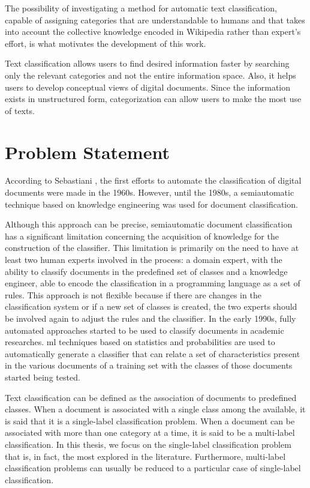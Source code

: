 The possibility of investigating a method for automatic text classification, capable of assigning categories that are understandable to humans and that takes into account the collective knowledge encoded in Wikipedia rather than expert's effort, is what motivates the development of this work.

Text classification allows users to find desired information faster by searching only the relevant categories and not the entire information space. Also, it helps users to develop conceptual views of digital documents. Since the information exists in unstructured form, categorization can allow users to make the most use of texts. 




\section{\hspace*{3pt}Problem Statement}


According to Sebastiani \cite{Sebastiani:2002}, the first efforts to automate the classification of digital documents were made in the 1960s. However, until the 1980s, a semiautomatic technique based on knowledge engineering was used for document classification.

Although this approach can be precise, semiautomatic document classification has a significant limitation concerning the acquisition of knowledge for the construction of the classifier. This limitation is primarily on the need to have at least two human experts involved in the process: a domain expert, with the ability to classify documents in the predefined set of classes and a knowledge engineer, able to encode the classification in a programming language as a set of rules. This approach is not flexible because if there are changes in the classification system or if a new set of classes is created, the two experts should be involved again to adjust the rules and the classifier.
In the early 1990s, fully automated approaches started to be used to classify documents in academic researches. \gls{ml} techniques based on statistics and probabilities are used to automatically generate a classifier that can relate a set of characteristics present in the various documents of a training set with the classes of those documents started being tested.


Text classification can be defined as the association of documents to predefined classes. When a document is associated with a single class among the available, it is said that it is a single-label classification problem. When a document can be associated with more than one category at a time, it is said to be a multi-label classification. In this thesis, we focus on the single-label classification problem that is, in fact, the most explored in the literature. Furthermore, multi-label classification problems can usually be reduced to a particular case of single-label classification.


